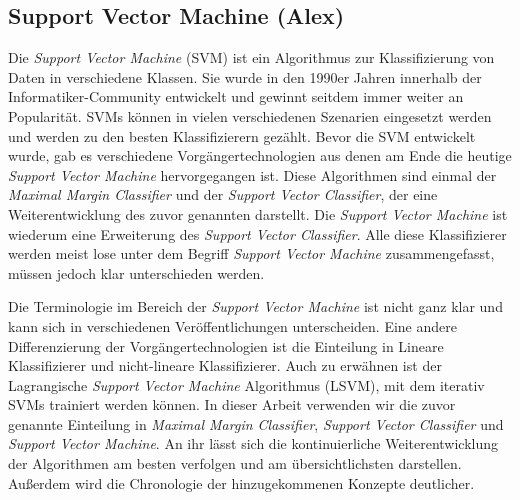 \subsection{Support Vector Machine (Alex)}
Die \textit{Support Vector Machine} (SVM) ist ein Algorithmus zur Klassifizierung von Daten in verschiedene Klassen.
Sie wurde in den 1990er Jahren innerhalb der Informatiker-Community entwickelt und gewinnt seitdem immer weiter an Popularität.
SVMs können in vielen verschiedenen Szenarien eingesetzt werden und werden zu den besten Klassifizierern gezählt.
Bevor die SVM entwickelt wurde, gab es verschiedene Vorgängertechnologien aus denen am Ende die heutige \textit{Support Vector Machine} hervorgegangen ist. 
Diese Algorithmen sind einmal der \textit{Maximal Margin Classifier} und der \textit{Support Vector Classifier}, 
der eine Weiterentwicklung des zuvor genannten darstellt.
Die \textit{Support Vector Machine} ist wiederum eine Erweiterung des \textit{Support Vector Classifier}.
Alle diese Klassifizierer werden meist lose unter dem Begriff \textit{Support Vector Machine} zusammengefasst,
müssen jedoch klar unterschieden werden.\cite[S. 337]{james_2013}

Die Terminologie im Bereich der \textit{Support Vector Machine} ist nicht ganz klar und kann sich in verschiedenen Veröffentlichungen unterscheiden.
Eine andere Differenzierung der Vorgängertechnologien ist die Einteilung in Lineare Klassifizierer und nicht-lineare Klassifizierer.
Auch zu erwähnen ist der Lagrangische \textit{Support Vector Machine} Algorithmus (LSVM), mit dem iterativ SVMs trainiert werden können.\cite[S. 207]{suthaharan_2015}
In dieser Arbeit verwenden wir die zuvor genannte Einteilung in \textit{Maximal Margin Classifier}, \textit{Support Vector Classifier}
und \textit{Support Vector Machine}. An ihr lässt sich die kontinuierliche Weiterentwicklung der Algorithmen am besten verfolgen und am übersichtlichsten darstellen.
Außerdem wird die Chronologie der hinzugekommenen Konzepte deutlicher.

